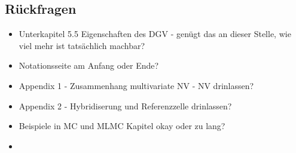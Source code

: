 \subsection{Rückfragen}
\begin{itemize}
	\item Unterkapitel 5.5 Eigenschaften des DGV - genügt das an dieser Stelle, wie viel mehr ist tatsächlich machbar?
	\item Notationsseite am Anfang oder Ende?
	\item Appendix 1 - Zusammenhang multivariate NV - NV drinlassen?
	\item Appendix 2 - Hybridiserung und Referenzzelle drinlassen?
	\item Beispiele in MC und MLMC Kapitel okay oder zu lang?
	\item 
\end{itemize}